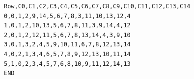 \begin{verbatim}
Row,C0,C1,C2,C3,C4,C5,C6,C7,C8,C9,C10,C11,C12,C13,C14
0,0,1,2,9,14,5,6,7,8,3,11,10,13,12,4
1,0,1,2,10,13,5,6,7,8,11,3,9,14,4,12
2,0,1,2,12,11,5,6,7,8,13,14,4,3,9,10
3,0,1,3,2,4,5,9,10,11,6,7,8,12,13,14
4,0,2,1,3,4,6,5,7,8,9,12,13,10,11,14
5,1,0,2,3,4,5,7,6,8,10,9,11,12,14,13
END
\end{verbatim}
